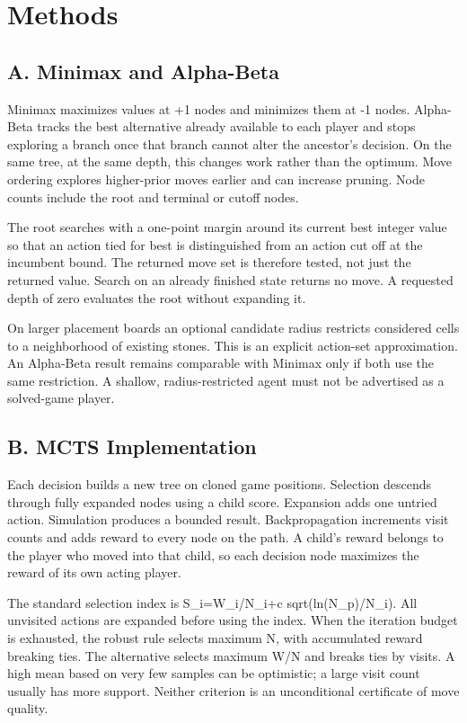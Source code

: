 \documentclass[conference]{IEEEtran}
\begin{document}
\section{Methods}

\subsection{A. Minimax and Alpha-Beta}

Minimax maximizes values at +1 nodes and minimizes them at -1 nodes. Alpha-Beta tracks the best alternative already available to each player and stops exploring a branch once that branch cannot alter the ancestor's decision. On the same tree, at the same depth, this changes work rather than the optimum. Move ordering explores higher-prior moves earlier and can increase pruning. Node counts include the root and terminal or cutoff nodes.


The root searches with a one-point margin around its current best integer value so that an action tied for best is distinguished from an action cut off at the incumbent bound. The returned move set is therefore tested, not just the returned value. Search on an already finished state returns no move. A requested depth of zero evaluates the root without expanding it.


On larger placement boards an optional candidate radius restricts considered cells to a neighborhood of existing stones. This is an explicit action-set approximation. An Alpha-Beta result remains comparable with Minimax only if both use the same restriction. A shallow, radius-restricted agent must not be advertised as a solved-game player.


\subsection{B. MCTS Implementation}

Each decision builds a new tree on cloned game positions. Selection descends through fully expanded nodes using a child score. Expansion adds one untried action. Simulation produces a bounded result. Backpropagation increments visit counts and adds reward to every node on the path. A child's reward belongs to the player who moved into that child, so each decision node maximizes the reward of its own acting player.


The standard selection index is S\_i=W\_i/N\_i+c sqrt(ln(N\_p)/N\_i). All unvisited actions are expanded before using the index. When the iteration budget is exhausted, the robust rule selects maximum N, with accumulated reward breaking ties. The alternative selects maximum W/N and breaks ties by visits. A high mean based on very few samples can be optimistic; a large visit count usually has more support. Neither criterion is an unconditional certificate of move quality.
\end{document}
